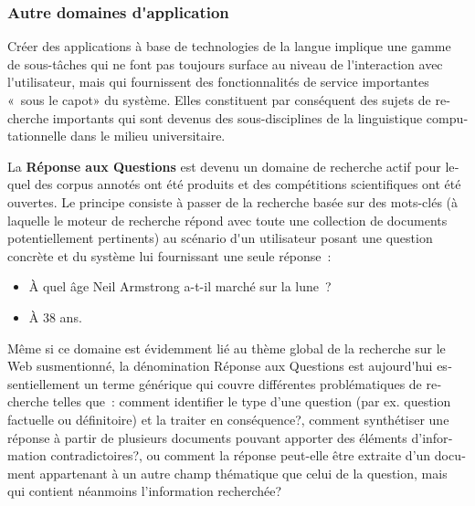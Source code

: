 \documentclass[]{../metanetpaper}
\begin{document}
\begin{french}
\begin{multicols}{2}
\subsubsection{Autre domaines d{\mbox '}application}

Créer des applications à base de technologies de la langue implique
une gamme de sous-tâches qui ne font pas toujours surface au niveau de
l{\mbox '}interaction avec l{\mbox '}utilisateur, mais qui fournissent des
fonctionnalités de service importantes «~sous le capot» du
système. Elles constituent par conséquent des sujets de recherche
importants qui sont devenus des sous-disciplines de la linguistique
computationnelle dans le milieu universitaire.

La {\bf Réponse aux Questions} est devenu un domaine de recherche actif pour
lequel des corpus annotés ont été produits et des compétitions
scientifiques ont été ouvertes. Le principe consiste à passer de la recherche
basée sur des mots-clés (à laquelle le moteur de recherche répond avec
toute une collection de documents potentiellement pertinents) au
scénario d{\mbox '}un utilisateur posant une question concrète et du système
lui fournissant une seule réponse~: 
\begin{itemize}
\item À quel âge Neil Armstrong a-t-il marché sur la lune~? 
\item À 38  ans.
\end{itemize}
Même si ce domaine est évidemment lié au thème global de la recherche
sur le Web susmentionné, la dénomination Réponse aux Questions est
aujourd{\mbox '}hui essentiellement un terme générique qui couvre
différentes problématiques de recherche telles que~: comment
identifier le type d'une question (par ex. question factuelle ou
définitoire) et la traiter en conséquence?, comment synthétiser une
réponse à partir de plusieurs documents pouvant apporter des éléments
d'information contradictoires?, ou comment la réponse peut-elle être
extraite d'un document appartenant à un autre champ thématique que
celui de la question, mais qui contient néanmoins l'information
recherchée?


\end{multicols}
\end{french}
\end{document}
